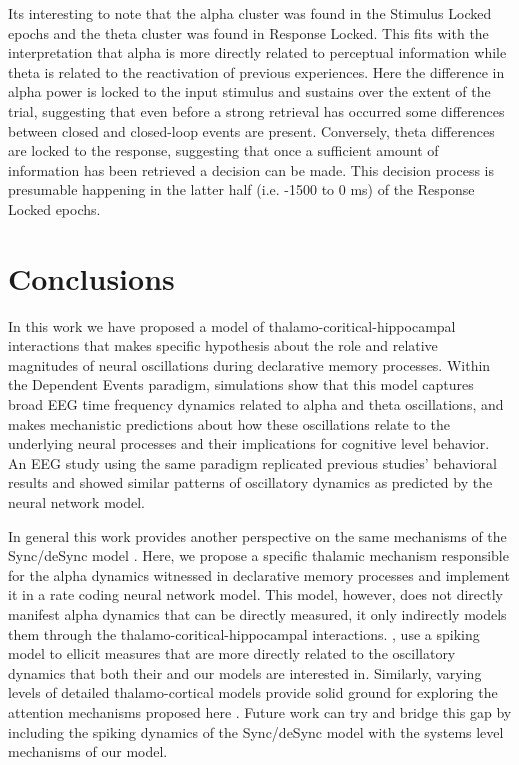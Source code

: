 \documentclass[11pt, titlepage, twoside]{article}
\begin{document}
Its interesting to note that the alpha cluster was found in the Stimulus Locked epochs and the theta cluster was found in Response Locked.  This fits with the interpretation that alpha is more directly related to perceptual information while theta is related to the reactivation of previous experiences.  Here the difference in alpha power is locked to the input stimulus and sustains over the extent of the trial, suggesting that even before a strong retrieval has occurred some differences between closed and closed-loop events are present.  Conversely, theta differences are locked to the response, suggesting that once a sufficient amount of information has been retrieved a decision can be made.  This decision process is presumable happening in the latter half (i.e. -1500 to 0 ms) of the Response Locked epochs.



\section{Conclusions}\label{sec:conclusions}

In this work we have proposed a model of thalamo-coritical-hippocampal interactions that makes specific hypothesis about the role and relative magnitudes of neural oscillations during declarative memory processes.  Within the Dependent Events paradigm, simulations show that this model captures broad EEG time frequency dynamics related to alpha and theta oscillations, and makes mechanistic predictions about how these oscillations relate to the underlying neural processes and their implications for cognitive level behavior.  An EEG study using the same paradigm replicated previous studies' behavioral results and showed similar patterns of oscillatory dynamics as predicted by the neural network model.  

In general this work provides another perspective on the same mechanisms of the Sync/deSync model \cite{ParishHanslmayrBowman18}.  Here, we propose a specific thalamic mechanism responsible for the alpha dynamics witnessed in declarative memory processes and implement it in a rate coding neural network model.  This model, however, does not directly manifest alpha dynamics that can be directly measured, it only indirectly models them through the thalamo-coritical-hippocampal interactions.  \textcite{ParishHanslmayrBowman18}, use a spiking model to ellicit measures that are more directly related to the oscillatory dynamics that both their and our models are interested in.  Similarly, varying levels of detailed thalamo-cortical models provide solid ground for exploring the attention mechanisms proposed here \cite{HindriksvanPutten13,BeckerKnockRitterEtAl15}.   Future work can try and bridge this gap by including the spiking dynamics of the Sync/deSync model with the systems level mechanisms of our model.
\end{document}
